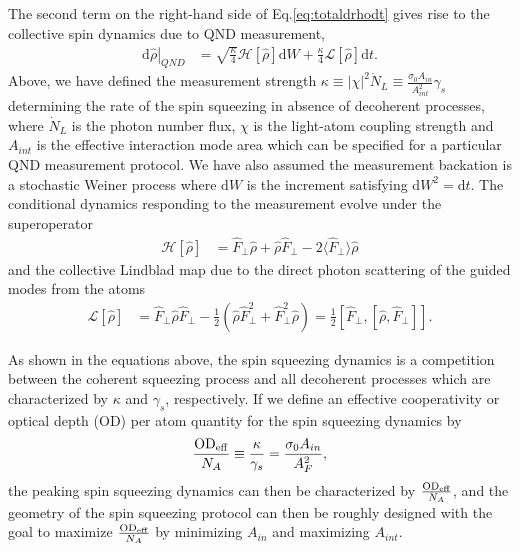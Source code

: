 \documentclass[preprint,aps,pra,onecolumn,superscriptaddress]{revtex4-1} %
\newcommand{\expect}[1]{\big\langle #1 \big\rangle}
\begin{document}
The second term on the right-hand side of Eq.\eqref{eq:totaldrhodt} gives rise to the collective spin dynamics due to QND measurement,
\begin{align}
\left.\mathrm{d}\hat{\rho}\right|_{QND} &= \sqrt{\frac{\kappa}{4}}\mathcal{H}\left[\hat{\rho} \right]\mathrm{d}W + \frac{\kappa}{4}\mathcal{L}\left[ \hat{\rho}\right]\mathrm{d}t.
\end{align}
Above, we have defined the measurement strength $\kappa \equiv |\chi|^2\dot{N}_L\equiv \frac{\sigma_0A_{in}}{A_{int}^2}\gamma_s $ determining the rate of the spin squeezing in absence of decoherent processes, where $\dot{N}_L$ is the photon number flux, $\chi$ is the light-atom coupling strength and $A_{int}$ is the effective interaction mode area which can be specified for a particular QND measurement protocol. We have also assumed the measurement backation is a stochastic Weiner process where $\mathrm{d}W$ is the increment satisfying $\mathrm{d}W^2 = \mathrm{d}t$. The conditional dynamics responding to the measurement evolve under the superoperator
\begin{align}
\mathcal{H}\left[ \hat{\rho}\right] &= \hat{F}_\perp\hat{\rho} + \hat{\rho}\hat{F}_\perp -2\expect{\hat{F}_\perp}\hat{\rho}
\end{align}
and the collective Lindblad map due to the direct photon scattering of the guided modes from the atoms
\begin{align}
\mathcal{L}\left[ \hat{\rho} \right] &= \hat{F}_\perp\hat{\rho}\hat{F}_\perp-\frac{1}{2}\left(\hat{\rho}\hat{F}_\perp^2+\hat{F}_\perp^2\hat{\rho} \right)=\frac{1}{2}\left[\hat{F}_\perp,\left[\hat{\rho},\hat{F}_\perp \right] \right].
\end{align}

As shown in the equations above, the spin squeezing dynamics is a competition between the coherent squeezing process and all decoherent processes which are characterized by $\kappa$ and $\gamma_s$, respectively. 
If we define an effective cooperativity or optical depth (OD) per atom quantity for the spin squeezing dynamics by
\begin{align}
\frac{\mathrm{OD}_{\rm eff}}{N_A} \equiv \frac{\kappa}{\gamma_s}=\frac{\sigma_0A_{in}}{A_F^2},
\end{align}
the peaking spin squeezing dynamics can then be characterized by $\frac{\mathrm{OD}_{\rm eff}}{N_A}$, and the geometry of the spin squeezing protocol can then be roughly designed with the goal to maximize $\frac{\mathrm{OD}_{\rm eff}}{N_A}$ by minimizing $A_{in}$ and maximizing $A_{int}$.  
\end{document}
